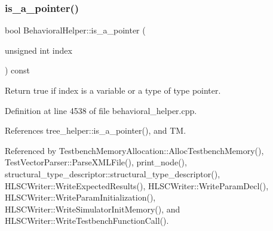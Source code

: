 \subsubsection{\texorpdfstring{is\+\_\+a\+\_\+pointer()}{is\_a\_pointer()}}
{\footnotesize\ttfamily bool Behavioral\+Helper\+::is\+\_\+a\+\_\+pointer (\begin{DoxyParamCaption}\item[{unsigned int}]{index }\end{DoxyParamCaption}) const\hspace{0.3cm}{\ttfamily [virtual]}}



Return true if index is a variable or a type of type pointer. 



Definition at line 4538 of file behavioral\+\_\+helper.\+cpp.



References tree\+\_\+helper\+::is\+\_\+a\+\_\+pointer(), and TM.



Referenced by Testbench\+Memory\+Allocation\+::\+Alloc\+Testbench\+Memory(), Test\+Vector\+Parser\+::\+Parse\+X\+M\+L\+File(), print\+\_\+node(), structural\+\_\+type\+\_\+descriptor\+::structural\+\_\+type\+\_\+descriptor(), H\+L\+S\+C\+Writer\+::\+Write\+Expected\+Results(), H\+L\+S\+C\+Writer\+::\+Write\+Param\+Decl(), H\+L\+S\+C\+Writer\+::\+Write\+Param\+Initialization(), H\+L\+S\+C\+Writer\+::\+Write\+Simulator\+Init\+Memory(), and H\+L\+S\+C\+Writer\+::\+Write\+Testbench\+Function\+Call().

